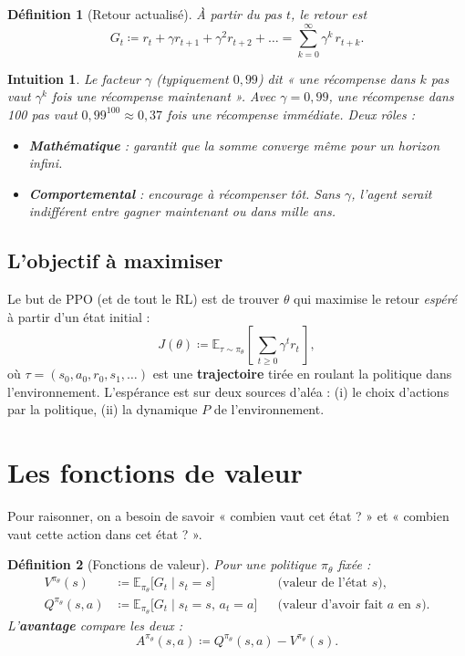 \documentclass[a4paper,11pt]{article}
\theoremstyle{clean}
\newtheorem*{defn}{Définition}
\newtheorem*{intu}{Intuition}
\newcommand{\E}{\mathbb{E}}
\newcommand{\piT}{\pi_{\theta}}
\begin{document}
\begin{defn}[Retour actualisé]
À partir du pas $t$, le retour est
\[
G_t \coloneqq r_t + \gamma r_{t+1} + \gamma^2 r_{t+2} + \dots = \sum_{k=0}^{\infty} \gamma^k\, r_{t+k}.
\]
\end{defn}

\begin{intu}
Le facteur $\gamma$ (typiquement $0{,}99$) dit « une récompense dans $k$ pas vaut $\gamma^k$ fois une récompense maintenant ». Avec $\gamma=0{,}99$, une récompense dans 100 pas vaut $0{,}99^{100}\approx 0{,}37$ fois une récompense immédiate. Deux rôles :
\begin{itemize}[nosep,leftmargin=1.2em]
\item \textbf{Mathématique} : garantit que la somme converge même pour un horizon infini.
\item \textbf{Comportemental} : encourage à récompenser \emph{tôt}. Sans $\gamma$, l'agent serait indifférent entre gagner maintenant ou dans mille ans.
\end{itemize}
\end{intu}

\subsection{L'objectif à maximiser}

Le but de PPO (et de tout le RL) est de trouver $\theta$ qui maximise le retour \emph{espéré} à partir d'un état initial :
\[
J(\theta) \coloneqq \E_{\tau \sim \piT}\!\left[\, \sum_{t\geq 0} \gamma^t r_t \,\right],
\]
où $\tau=(s_0,a_0,r_0,s_1,\dots)$ est une \textbf{trajectoire} tirée en roulant la politique dans l'environnement. L'espérance est sur deux sources d'aléa : (i) le choix d'actions par la politique, (ii) la dynamique $P$ de l'environnement.

\section{Les fonctions de valeur}

Pour raisonner, on a besoin de savoir « combien vaut cet état ? » et « combien vaut cette action dans cet état ? ».

\begin{defn}[Fonctions de valeur]
Pour une politique $\piT$ fixée :
\begin{align*}
V^{\piT}(s) &\coloneqq \E_{\piT}\!\big[G_t \mid s_t = s\big] & &\text{(valeur de l'état $s$)},\\
Q^{\piT}(s,a) &\coloneqq \E_{\piT}\!\big[G_t \mid s_t = s,\, a_t = a\big] & &\text{(valeur d'avoir fait $a$ en $s$)}.
\end{align*}
L'\textbf{avantage} compare les deux :
\[
A^{\piT}(s,a) \coloneqq Q^{\piT}(s,a) - V^{\piT}(s).
\]
\end{defn}
\end{document}
